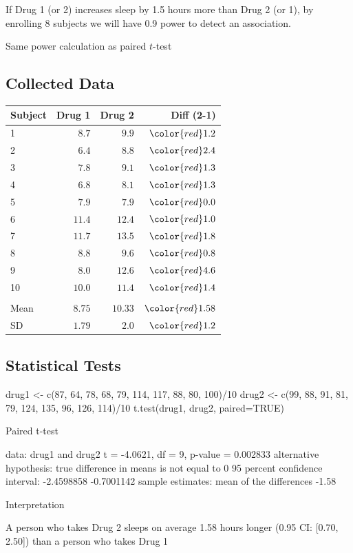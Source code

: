 \bi
\item If Drug 1 (or 2) increases sleep by 1.5 hours more than Drug 2 (or 1), by enrolling 8 subjects we will have 0.9 power to detect an association.
\item Same power calculation as paired $t$-test
\ei

\subsection{Collected Data}
 \begin{center}
 \begin{tabular}{lrrr}\hline\hline
Subject & Drug 1 & Drug 2 & {\color{red}Diff (2-1)}
\\ \hline
1  &$8.7$ &$ 9.9$&$\color{red}1.2$\\
2  &$6.4$ &$ 8.8$&$\color{red}2.4$\\
3  &$7.8$ &$ 9.1$&$\color{red}1.3$\\
4  &$6.8$ &$ 8.1$&$\color{red}1.3$\\
5  &$7.9$ &$ 7.9$&$\color{red}0.0$\\
6  &$11.4$&$ 12.4$&$\color{red}1.0$\\
7  &$11.7$&$ 13.5$&$\color{red}1.8$\\
8  &$8.8$ &$ 9.6$&$\color{red}0.8$\\
9  &$8.0$ &$ 12.6$&$\color{red}4.6$\\
10 &$10.0$&$ 11.4$&$\color{red}1.4$\\ \\
Mean&$8.75$&$ 10.33$&$\color{red}1.58$\\
SD  &$1.79$&$ 2.0$  &$\color{red}1.2$\\
\hline
\end{tabular}
\end{center}

\subsection{Statistical Tests}
\begin{Schunk}
\begin{Sinput}
drug1 <- c(87, 64, 78, 68, 79, 114, 117, 88, 80, 100)/10
drug2 <- c(99, 88, 91, 81, 79, 124, 135, 96, 126, 114)/10
t.test(drug1, drug2, paired=TRUE)
\end{Sinput}
\begin{Soutput}

	Paired t-test

data:  drug1 and drug2
t = -4.0621, df = 9, p-value = 0.002833
alternative hypothesis: true difference in means is not equal to 0
95 percent confidence interval:
 -2.4598858 -0.7001142
sample estimates:
mean of the differences 
                  -1.58 
\end{Soutput}
\end{Schunk}
\bi
\item Interpretation
 \bi
 \item A person who takes Drug 2 sleeps on average 1.58 hours longer (0.95 CI: [0.70, 2.50]) than a person who takes Drug 1
 \ei
\ei

